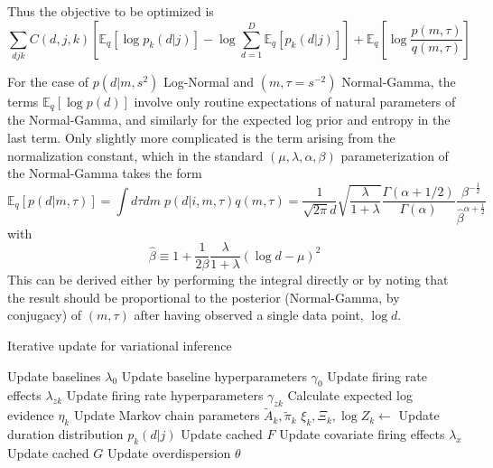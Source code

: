 \documentclass[12pt,a4paper]{article}
\begin{document}
\begin{flushleft}
Thus the objective to be optimized is
\begin{equation}
    \sum_{d j k} C(d, j, k) \left[\mathbb{E}_q \left[\log p_k(d|j)\right] - \log \sum_{d=1}^D \mathbb{E}_q\left[p_k(d|j) \right] \right] + \mathbb{E}_q\left[\log \frac{p(m, \tau)}{q(m, \tau)} \right]
\end{equation}

For the case of $p(d|m, s^2)$ Log-Normal and $(m, \tau = s^{-2})$ Normal-Gamma, the terms $\mathbb{E}_q[\log p(d)]$ involve only routine expectations of natural parameters of the Normal-Gamma, and similarly for the expected log prior and entropy in the last term. Only slightly more complicated is the term arising from the normalization constant, which in the standard $(\mu, \lambda, \alpha, \beta)$ parameterization of the Normal-Gamma takes the form
\begin{equation}
    \mathbb{E}_q[p(d|m, \tau)] = \int d\tau dm \; p(d|i, m, \tau) q(m, \tau)
    = \frac{1}{\sqrt{2\pi}d} \sqrt{\frac{\lambda}{1 + \lambda}}
    \frac{\Gamma(\alpha + 1/2)}{\Gamma(\alpha)}
    \frac{\beta^{-\frac{1}{2}}}{\hat{\beta}^{\alpha + \frac{1}{2}}}
\end{equation}
with
\begin{equation}
    \hat{\beta} \equiv 1 + \frac{1}{2\beta} \frac{\lambda}{1 + \lambda}
    (\log d - \mu)^2
\end{equation}
This can be derived either by performing the integral directly or by noting that the result should be proportional to the posterior (Normal-Gamma, by conjugacy) of $(m, \tau)$ after having observed a single data point, $\log d$.

\begin{algorithm}[ht]
\caption{Iterative update for variational inference}\label{algo}
\begin{algorithmic}[1]
    \State Update baselines $\lambda_0$
    \State Update baseline hyperparameters $\gamma_0$
        \State Update firing rate effects $\lambda_{zk}$
        \State Update firing rate hyperparameters $\gamma_{zk}$
        \State Calculate expected log evidence $\eta_k$
        \State Update Markov chain parameters $\tilde{A}_k, \tilde{\pi}_k$
        \State $\xi_k, \Xi_k, \log Z_k \gets$
            \State Update duration distribution $p_k(d|j)$
        \EndIf
        \State Update cached $F$
    \EndFor
    \State Update covariate firing effects $\lambda_x$
    \State Update cached $G$
    \State Update overdispersion $\theta$
\EndProcedure
\end{algorithmic}
\end{algorithm}


\end{flushleft}
\end{document}

